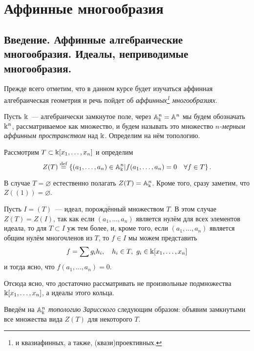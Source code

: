     \newpage
 \section{Аффинные многообразия}

	\subsection{Введение. Аффинные алгебраические многообразия. Идеалы, неприводимые многообразия. }\hypertarget{bilet_1}{}
	
	Прежде всего отметим, что в данном курсе будет изучаться аффинная алгебраическая геометрия и речь пойдет об \emph{аффинных\footnote{и квазиафинных, а также, (квази)проективных.} многообразиях}. 

	Пусть $\Bbbk$~--- алгебраически замкнутое поле, через $\mathbb{A}_{\Bbbk}^n = \mathbb{A}^n$ мы будем обозначать $\Bbbk^n$, рассматриваемое как множество, и будем называть это множество \emph{$n$-мерным аффинным пространством} над $\Bbbk$. Определим на нём топологию. 

	\begin{definition} 
		Рассмотрим $T \subset \Bbbk[x_1, \ldots, x_n]$ и определим 
	\[
		Z(T) \stackrel{\mathrm{def}}{=} \left\{ (a_1, \ldots, a_n) \in \mathbb{A}_{\Bbbk}^n \vert f(a_1, \ldots, a_n) = 0 \quad \forall f \in T \right\}. 
	\]
	\end{definition}

	\begin{remark}
		В случае $T = \varnothing$ естественно полагать $Z(T) = \mathbb{A}_{\Bbbk}^n$. Кроме того, сразу заметим, что $Z((1)) = \varnothing$. 
	\end{remark}

	\begin{remark}
		Пусть $I = (T)$~--- идеал, порождённый множеством $T$. В этом случае $Z(T) = Z(I)$, так как если $(a_1, \ldots, a_n)$ является нулём для всех элементов идеала, то для $T \subset I$ уж тем более, и, кроме того, если $(a_1, \ldots, a_n)$ является общим нулём многочленов из $T$, то $f \in I$ мы можем представить 
	\[
		f = \sum g_i h_i, \quad h_i \in T, \ g_i \in \Bbbk[x_1, \ldots, x_n]
	\]
	и тогда ясно, что $f(a_1, \ldots, a_n) = 0$. 

	Отсюда ясно, что достаточно рассматривать не произвольные подмножества $\Bbbk[x_1, \ldots, x_n]$, а идеалы этого кольца. 
	\end{remark}
	

	\begin{definition} 
		Введём на $\mathbb{A}_{\Bbbk}^n$ \emph{топологию Зарисского} следующим образом: объявим замкнутыми все множества вида $Z(T)$ для некоторого $T$. 
	\end{definition}

